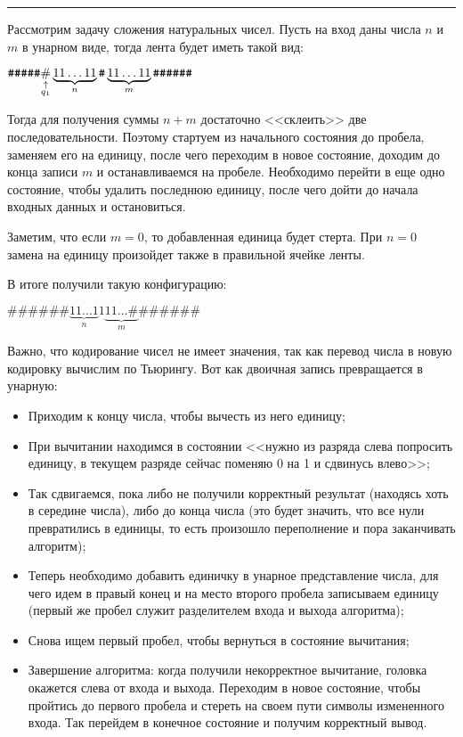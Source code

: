 \documentclass[a4paper, fleqn]{article}
\begin{document}
        \bigskip \hrule

        Рассмотрим задачу сложения натуральных чисел. Пусть на вход даны числа $n$ и $m$ в унарном виде, тогда лента будет иметь такой вид:

        $\verb'#####' \underset{\substack{\uparrow \\ q_1 \\}}{\#} \underbrace{11\dots11}_{n}\verb'#'\underbrace{11\dots11}_{m}\verb'######'$

        Тогда для получения суммы $n + m$ достаточно <<склеить>> две последовательности. Поэтому стартуем из начального состояния до пробела, заменяем его на единицу, после чего переходим в новое состояние, доходим до конца записи $m$ и останавливаемся на пробеле. Необходимо перейти в еще одно состояние, чтобы удалить последнюю единицу, после чего дойти до начала входных данных и остановиться.

        Заметим, что если $m = 0$, то добавленная единица будет стерта. При $n = 0$ замена на единицу произойдет также в правильной ячейке ленты.

        В итоге получили такую конфигурацию:

        $\#\#\#\#\#\#\underbrace{11\dots1}_{n}1\underbrace{11\dots\#}_{m}\#\#\#\#\#\#$

        Важно, что кодирование чисел не имеет значения, так как перевод числа в новую кодировку вычислим по Тьюрингу. Вот как двоичная запись превращается в унарную:

        \begin{itemize}
            \item Приходим к концу числа, чтобы вычесть из него единицу;
            \item При вычитании находимся в состоянии <<нужно из разряда слева попросить единицу, в текущем разряде сейчас поменяю 0 на 1 и сдвинусь влево>>;
            \item Так сдвигаемся, пока либо не получили корректный результат (находясь хоть в середине числа), либо до конца числа (это будет значить, что все нули превратились в единицы, то есть произошло переполнение и пора заканчивать алгоритм);
            \item Теперь необходимо добавить единичку в унарное представление числа, для чего идем в правый конец и на место второго пробела записываем единицу (первый же пробел служит разделителем входа и выхода алгоритма);
            \item Снова ищем первый пробел, чтобы вернуться в состояние вычитания;
            \item Завершение алгоритма: когда получили некорректное вычитание, головка окажется слева от входа и выхода. Переходим в новое состояние, чтобы пройтись до первого пробела и стереть на своем пути символы измененного входа. Так перейдем в конечное состояние и получим корректный вывод.
        \end{itemize}
\end{document}
